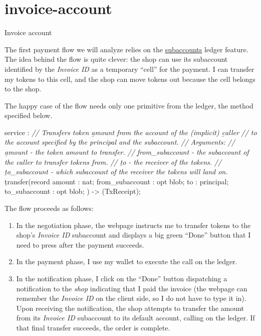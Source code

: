 \documentclass{article}
\begin{document}
\section{invoice-account}{Invoice account}

The first payment flow we will analyze relies on the \href{/posts/09-fungible-tokens-101.html#subaccounts}{subaccounts} ledger feature.
The idea behind the flow is quite clever: the shop can use its subaccount identified by the \emph{Invoice ID} as a temporary ``cell'' for the payment.
I can transfer my tokens to this cell, and the shop can move tokens out because the cell belongs to the shop.

The happy case of the flow needs only one primitive from the ledger, the  method specified below.

\begin{code}[candid]
service : {
  \emph{// Transfers token \b{amount} from the account of the (implicit) \b{caller}}
  \emph{// to the account specified by the principal and the subaccount.}
  \emph{// Arguments:}
  \emph{//   \b{amount} - the token amount to transfer.}
  \emph{//   \b{from_subaccount} - the subaccount of the caller to transfer tokens from.}
  \emph{//   \b{to} - the receiver of the tokens.}
  \emph{//   \b{to_subaccount} - which subaccount of the receiver the tokens will land on.}
  \b{transfer}(record {
    amount : nat;
    from_subaccount : opt blob;
    to : principal;
    to_subaccount : opt blob;
  }) -> (TxReceipt);
}
\end{code}

The flow proceeds as follows:
\begin{enumerate}
  \item 
    In the negotiation phase, the webpage instructs me to transfer tokens to the shop's \emph{Invoice ID} subaccount and displays a big green ``Done'' button that I need to press after the payment succeeds.
  \item 
    In the payment phase, I use my wallet to execute the  call on the ledger.
  \item 
    In the notification phase, I click on the ``Done'' button dispatching a notification to the \emph{shop} indicating that I paid the invoice (the webpage can remember the \emph{Invoice ID} on the client side, so I do not have to type it in).
    Upon receiving the notification, the shop attempts to transfer the amount from its \emph{Invoice ID} subaccount to its default account, calling  on the ledger.
    If that final transfer succeeds, the order is complete.
\end{enumerate}
\end{document}
